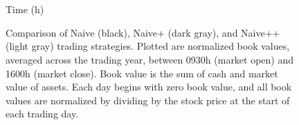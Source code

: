 \begin{figure}
\centering
\begin{subfigure}{.45\linewidth}
  \centering
  \setlength\figureheight{\linewidth} 
  \setlength\figurewidth{\linewidth}
  
\end{subfigure}%
\hfill%
\begin{subfigure}{.45\linewidth}
  \centering
  \setlength\figureheight{\linewidth} 
  \setlength\figurewidth{\linewidth}
   
\end{subfigure}\\
\vspace{1cm}
\begin{subfigure}{.45\linewidth}
  \centering
  \setlength\figureheight{\linewidth} 
  \setlength\figurewidth{\linewidth}
   
\end{subfigure}%
\hfill%
\begin{subfigure}{.45\linewidth}
  \centering
  \setlength\figureheight{\linewidth} 
  \setlength\figurewidth{\linewidth}
   
\end{subfigure}\\

\leavevmode{}\hspace{0pt plus 1filll}\null

Time (h)

\vspace{1cm}
\begin{subfigure}{\linewidth}
  \centering
   
\end{subfigure}%
  \caption[Comparison of the naive trading strategies]{Comparison of Naive (black), Naive+ (dark gray), and Naive++ (light gray) trading strategies. Plotted are normalized book values, averaged across the trading year, between 0930h (market open) and 1600h (market close). Book value is the sum of cash and market value of assets. Each day begins with zero book value, and all book values are normalized by dividing by the stock price at the start of each trading day.}
  \label{fig:comp}
\end{figure}


